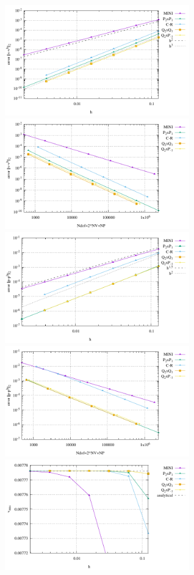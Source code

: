 \begin{center}
\includegraphics[width=8cm]{python_codes/fieldstone_112/results/exp1/errors_V.pdf}
\includegraphics[width=8cm]{python_codes/fieldstone_112/results/exp1/errors_V_ndof.pdf}\\
\includegraphics[width=8cm]{python_codes/fieldstone_112/results/exp1/errors_P.pdf}
\includegraphics[width=8cm]{python_codes/fieldstone_112/results/exp1/errors_P_ndof.pdf}\\
\includegraphics[width=8cm]{python_codes/fieldstone_112/results/exp1/vrms.pdf}

\end{center}
